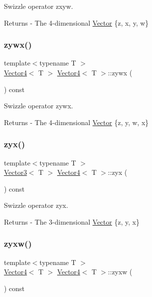 Swizzle operator zxyw. \begin{DoxyReturn}{Returns}
-\/ The 4-\/dimensional \mbox{\hyperlink{class_vector}{Vector}} \{z, x, y, w\} 
\end{DoxyReturn}
\mbox{\label{class_vector4_ae8f4f0248ef183d1562110990939568a}} 
\subsubsection{\texorpdfstring{zywx()}{zywx()}}
{\footnotesize\ttfamily template$<$typename T $>$ \\
\mbox{\hyperlink{class_vector4}{Vector4}}$<$ T $>$ \mbox{\hyperlink{class_vector4}{Vector4}}$<$ T $>$\+::zywx (\begin{DoxyParamCaption}{ }\end{DoxyParamCaption}) const}

Swizzle operator zywx. \begin{DoxyReturn}{Returns}
-\/ The 4-\/dimensional \mbox{\hyperlink{class_vector}{Vector}} \{z, y, w, x\} 
\end{DoxyReturn}
\mbox{\label{class_vector4_aba4508c629559b731b21d49e780b4d91}} 
\subsubsection{\texorpdfstring{zyx()}{zyx()}}
{\footnotesize\ttfamily template$<$typename T $>$ \\
\mbox{\hyperlink{class_vector3}{Vector3}}$<$ T $>$ \mbox{\hyperlink{class_vector4}{Vector4}}$<$ T $>$\+::zyx (\begin{DoxyParamCaption}{ }\end{DoxyParamCaption}) const}

Swizzle operator zyx. \begin{DoxyReturn}{Returns}
-\/ The 3-\/dimensional \mbox{\hyperlink{class_vector}{Vector}} \{z, y, x\} 
\end{DoxyReturn}
\mbox{\label{class_vector4_a0afd1b5b8b0797eed6b2b90ab2a38761}} 
\subsubsection{\texorpdfstring{zyxw()}{zyxw()}}
{\footnotesize\ttfamily template$<$typename T $>$ \\
\mbox{\hyperlink{class_vector4}{Vector4}}$<$ T $>$ \mbox{\hyperlink{class_vector4}{Vector4}}$<$ T $>$\+::zyxw (\begin{DoxyParamCaption}{ }\end{DoxyParamCaption}) const}


